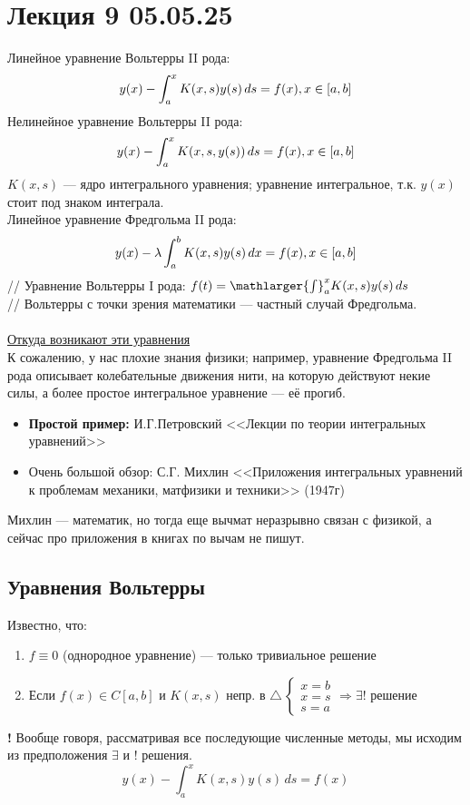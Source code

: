 \section{Лекция 9 05.05.25}
Линейное уравнение Вольтерры II рода:
\[y(x) -  \int_{a}^{x} K(x,s)y(s) \,ds  = f(x),\space x\in[a,b] \] 
Нелинейное уравнение Вольтерры II рода:
\[y(x) -  \int_{a}^{x} K(x,s,y(s)) \,ds  = f(x),\space x\in[a,b] \] 
\(K(x,s)\) --- ядро интегрального уравнения; уравнение интегральное, т.к. \(y(x)\) стоит под знаком интеграла.\\
Линейное уравнение Фредгольма II рода: 
\[y(x) -  \lambda\int_{a}^{b} K(x,s)y(s) \,dx  = f(x),\space x\in[a,b] \] 
// Уравнение Вольтерры I рода: \( f(t) = \mathlarger{\int}_{a}^{x} K(x,s)y(s)\,ds\)\\// Вольтерры с точки зрения математики --- частный случай Фредгольма.\\\\
\underline{Откуда возникают эти уравнения}\\
К сожалению, у нас плохие знания физики; например, уравнение Фредгольма II рода описывает колебательные движения нити, на которую действуют некие силы, а более простое интегральное уравнение --- её прогиб.
\begin{itemize}
    \item \textbf{Простой пример:} И.Г.Петровский <<Лекции по теории интегральных уравнений>>
    \item Очень большой обзор: С.Г. Михлин <<Приложения интегральных уравнений к проблемам механики, матфизики и техники>> (1947г)
\end{itemize}
Михлин --- математик, но тогда еще вычмат неразрывно связан с физикой, а сейчас про приложения в книгах по вычам не пишут.
\subsection{Уравнения Вольтерры}
Известно, что:
\begin{enumerate}
    \item \( f \equiv 0\) (однородное уравнение) --- только тривиальное решение
    \item Если \(f(x) \in C[a,b]\) и \(K(x,s)\) непр. в $\triangle \, \begin{cases} 
    x=b\\
    x=s\\
    s=a
    \end{cases} \Rightarrow \exists!$ решение
\end{enumerate}
\textbf{!} Вообще говоря, рассматривая все последующие численные методы, мы исходим из предположения $\exists$ и $!$ решения.
\[y(x) -  \int_{a}^{x} K(x,s)y(s) \,ds  = f(x) \]
